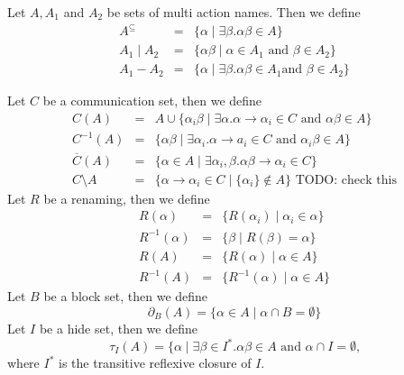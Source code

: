 \documentclass{article}
\begin{document}
Let $A,A_{1}$ and $A_{2}$ be sets of multi action names. Then we define%
\[
\begin{array}{lll}
A^{\subseteq } & = & \{\alpha \mid \exists \beta .\alpha \beta \in A\} \\ 
A_{1}\mid A_{2} & = & \{\alpha \beta \mid \alpha \in A_{1}\text{ and }\beta
\in A_{2}\} \\ 
A_{1}-A_{2} & = & \{\alpha \mid \exists \beta .\alpha \beta \in A_{1}\text{
and }\beta \in A_{2}\}%
\end{array}%
\]

Let $C$ be a communication set, then we define%
\begin{eqnarray*}
C(A) &=&A\cup \{\alpha _{i}\beta \mid \exists \alpha .\alpha \rightarrow
\alpha _{i}\in C\text{ and }\alpha \beta \in A\} \\
C^{-1}(A) &=&\{\alpha \beta \mid \exists \alpha _{i}.\alpha \rightarrow
a_{i}\in C\text{ and }\alpha _{i}\beta \in A\} \\
\overline{C}(A) &=&\{\alpha \in A\mid \exists \alpha _{i},\beta .\alpha
\beta \rightarrow \alpha _{i}\in C\} \\
C\setminus A &=&\{\alpha \rightarrow \alpha _{i}\in C\mid \{\alpha
_{i}\}\notin A\}\text{ TODO: check this}
\end{eqnarray*}%
Let $R$ be a renaming, then we define%
\begin{eqnarray*}
R(\alpha ) &=&\{R(\alpha _{i})\mid \alpha _{i}\in \alpha \} \\
R^{-1}(\alpha ) &=&\{\beta \mid R(\beta )=\alpha \} \\
R(A) &=&\{R(\alpha )\mid \alpha \in A\} \\
R^{-1}(A) &=&\{R^{-1}(\alpha )\mid \alpha \in A\}
\end{eqnarray*}%
Let $B$ be a block set, then we define%
\[
\partial _{B}(A)=\{\alpha \in A\mid \alpha \cap B=\emptyset \} 
\]%
Let $I$ be a hide set, then we define%
\[
\tau _{I}(A)=\{\alpha \mid \exists \beta \in I^{\ast }.\alpha \beta \in A%
\text{ and }\alpha \cap I=\emptyset \text{,} 
\]%
where $I^{\ast }$ is the transitive reflexive closure of $I$.\newpage
\end{document}
